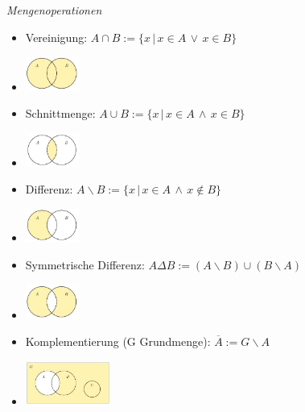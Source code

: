 \noindent
\textit{Mengenoperationen}\linebreak
\begin{itemize}
    \item Vereinigung: $A \cap B := \{x\,|\,x \in A\, \lor\, x \in B \}$
    \item \includegraphics[width=50pt]{./images/vereinigung.jpg}
    \item Schnittmenge: $A \cup B := \{x\,|\,x \in A\, \land\, x \in B \}$
    \item \includegraphics[width=50pt]{./images/schnittmenge.jpg}
    \item Differenz: $A \backslash B := \{x\,|\,x \in A\, \land\, x \notin B \}$
    \item \includegraphics[width=50pt]{./images/differenz.jpg}
    \item Symmetrische Differenz: $A\Delta B := (A\backslash B)\cup (B\backslash A)$
    \item \includegraphics[width=50pt]{./images/systematische_differenz.jpg}
    \item Komplementierung (G Grundmenge): $\overline{A} := G\backslash A$
    \item \includegraphics[width=80pt]{./images/komplementaer.jpg}
\end{itemize}
\vspace{1mm}

